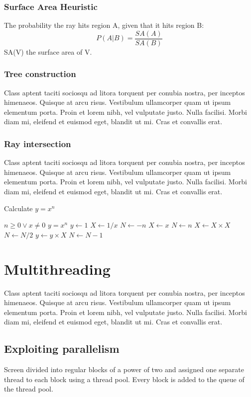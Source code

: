 \subsubsection{Surface Area Heuristic}
The probability the ray hits region A, given that it hits region B:
\[
P(A|B) = \dfrac{SA(A)}{SA(B)}
\]
SA(V) the surface area of V.
\subsubsection{Tree construction}
Class aptent taciti sociosqu ad litora torquent per conubia nostra, per inceptos himenaeos. Quisque at arcu risus. Vestibulum ullamcorper quam ut ipsum elementum porta. Proin et lorem nibh, vel vulputate justo. Nulla facilisi. Morbi diam mi, eleifend et euismod eget, blandit ut mi. Cras et convallis erat.
\subsubsection{Ray intersection}
Class aptent taciti sociosqu ad litora torquent per conubia nostra, per inceptos himenaeos. Quisque at arcu risus. Vestibulum ullamcorper quam ut ipsum elementum porta. Proin et lorem nibh, vel vulputate justo. Nulla facilisi. Morbi diam mi, eleifend et euismod eget, blandit ut mi. Cras et convallis erat.
\begin{algorithm}
\caption{Calculate $y = x^n$}
\begin{algorithmic} 
\REQUIRE $n \geq 0 \vee x \neq 0$
\ENSURE $y = x^n$
\STATE $y \leftarrow 1$
\STATE $X \leftarrow 1 / x$
\STATE $N \leftarrow -n$
\ELSE
\STATE $X \leftarrow x$
\STATE $N \leftarrow n$
\ENDIF
{}
\STATE $X \leftarrow X \times X$
\STATE $N \leftarrow N / 2$
\ELSE[$N$ is odd]
\STATE $y \leftarrow y \times X$
\STATE $N \leftarrow N - 1$
\ENDIF
\ENDWHILE
\end{algorithmic}
\end{algorithm}
\section{Multithreading}
Class aptent taciti sociosqu ad litora torquent per conubia nostra, per inceptos himenaeos. Quisque at arcu risus. Vestibulum ullamcorper quam ut ipsum elementum porta. Proin et lorem nibh, vel vulputate justo. Nulla facilisi. Morbi diam mi, eleifend et euismod eget, blandit ut mi. Cras et convallis erat.
\subsection{Exploiting parallelism}
Screen divided into regular blocks of a power of two and assigned one separate thread to each block using a thread pool. Every block
is added to the queue of the thread pool.
